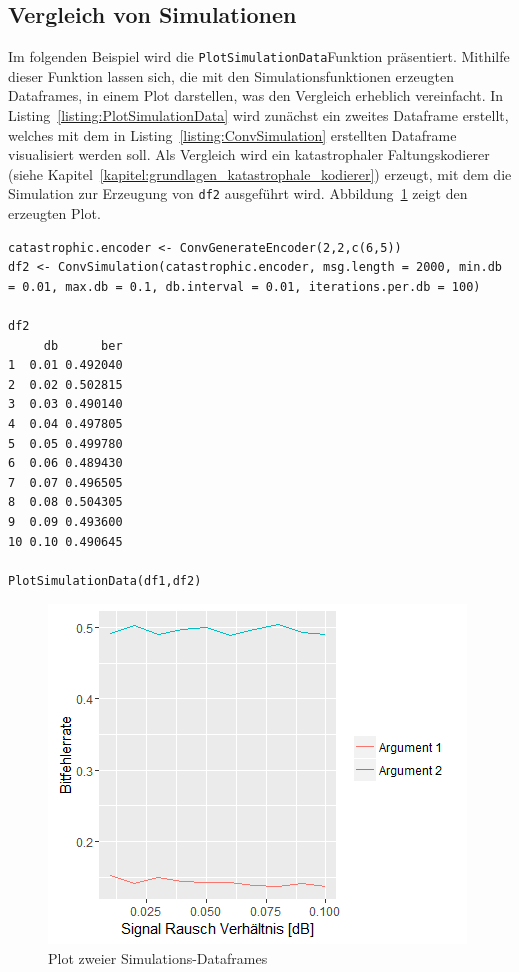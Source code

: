 \subsection{Vergleich von Simulationen}
\label{kapitel:beispiele_simulation_vergleich}
Im folgenden Beispiel wird die \texttt{PlotSimulationData}\-Funktion präsentiert. Mithilfe dieser Funktion lassen sich, die mit den Simulationsfunktionen erzeugten Dataframes, in einem Plot darstellen, was den Vergleich erheblich vereinfacht. In Listing~\ref{listing:PlotSimulationData} wird zunächst ein zweites Dataframe erstellt, welches mit dem in Listing~\ref{listing:ConvSimulation} erstellten Dataframe visualisiert werden soll. Als Vergleich wird ein katastrophaler Faltungskodierer (siehe Kapitel~\ref{kapitel:grundlagen_katastrophale_kodierer}) erzeugt, mit dem die Simulation zur Erzeugung von \texttt{df2} ausgeführt wird. Abbildung~\ref{abb:PlotSimulationData} zeigt den erzeugten Plot.
\begin{lstlisting}[caption=Vergleich mehrerer Simulationsdaten, label={listing:PlotSimulationData}, float=!th]
catastrophic.encoder <- ConvGenerateEncoder(2,2,c(6,5))
df2 <- ConvSimulation(catastrophic.encoder, msg.length = 2000, min.db = 0.01, max.db = 0.1, db.interval = 0.01, iterations.per.db = 100)

df2
     db      ber
1  0.01 0.492040
2  0.02 0.502815
3  0.03 0.490140
4  0.04 0.497805
5  0.05 0.499780
6  0.06 0.489430
7  0.07 0.496505
8  0.08 0.504305
9  0.09 0.493600
10 0.10 0.490645

PlotSimulationData(df1,df2)
\end{lstlisting}
\begin{figure}[!ht]
	\centering
	\includegraphics[width=\ScaleIfNeeded]{abbildungen/Rplot_PlotSimulationData}
	\caption{Plot zweier Simulations-Dataframes}
	\label{abb:PlotSimulationData}
\end{figure}